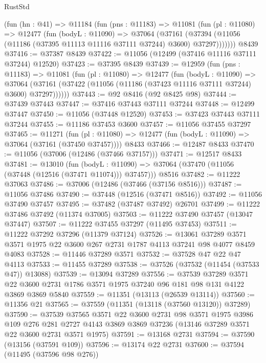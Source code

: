 \begin{lexlean}{RustStd}
\begin{coremodule}
    (fun (hn : @41) =>
    @11184
      (fun (pns : @11183) =>
      @11081
        (fun (pl : @11080) =>
        @12477
          (fun (bodyL : @11090) =>
          @37064
            (@37161
              (@37394 (@11056 (@11186 (@37395 @11113 @11116 @37111 @37244) @3600) @37297)))))))
    @8439
@37416 := @37387 @8439
@37422 := @11056 (@12499 (@37416 @11116 @37111 @37244) @12520)
@37423 := @37395 @8439
@37439 := @12959
    (fun (pns : @11183) =>
    @11081
      (fun (pl : @11080) =>
      @12477
        (fun (bodyL : @11090) =>
        @37064 (@37161 (@37422 (@11056 (@11186 (@37423 @11116 @37111 @37244) @3600) @37297))))))
@37443 := @92 @8416 (@92 @8425 @98)
@37444 := @37439 @37443
@37447 := @37416 @37443 @37111 @37244
@37448 := @12499 @37447
@37450 := @11056 (@37448 @12520)
@37453 := @37423 @37443 @37111 @37244
@37455 := @11186 @37453 @3600
@37457 := @11056 @37455 @37297
@37465 := @11271
    (fun (pl : @11080) => @12477 (fun (bodyL : @11090) => @37064 (@37161 (@37450 @37457))))
    @8433
@37466 := @12487 @8433
@37470 := @11056 (@37006 (@12486 (@37466 @37157)))
@37471 := @12517 @8433
@37481 := @13010
    (fun (bodyL : @11090) => @37064 (@37470 (@11056 (@37448 (@12516 (@37471 @11074))) @37457)))
    @8516
@37482 := @11222 @37063
@37486 := @37006 (@12486 (@37466 (@37156 @8516)))
@37487 := @11056 @37486
@37490 := @37448 (@12516 (@37471 @8516))
@37492 := @11056 @37490 @37457
@37495 := @37482 (@37487 @37492) @26701
@37499 := @11222 @37486 @37492 (@11374 @37005)
@37503 := @11222 @37490 @37457 (@13047 @37447)
@37507 := @11222 @37455 @37297 (@11495 @37453)
@37511 := @11222 @37292 @37296 (@11379 @37124)
@37526 := @13061
    @37289
    @3571
    @3571
    @1975
    @22
    @3600
    @267
    @2731
    @1787
    @4113
    @37241
    @98
    @4077
    @8459
    @4083
@37528 := @11446 @37289 @3571
@37532 := @37528 @47 @22 @47 @4113
@37533 := @11455 @37289
@37538 := @37526 (@37532 (@11454 (@37533 @47)) @13088)
@37539 := @13094 @37289
@37556 := @37539
    @37289
    @3571
    @22
    @3600
    @2731
    @1786
    @3571
    @1975
    @37240
    @96
    @181
    @98
    @131
    @4122
    @3869
    @3869
    @5840
@37559 := @11351 (@13113 (@26539 @13114))
@37560 := @11356 @21
@37565 := @37559 (@11351 (@13118 (@37560 @13120)) @37289)
@37590 := @37539
    @37565
    @3571
    @22
    @3600
    @2731
    @98
    @3571
    @1975
    @3986
    @109
    @276
    @281
    @2727
    @4143
    @3869
    @3869
    @37236
    (@13146 @37289 @3571 @22 @3600 @2731 @3571 @1975)
@37591 := @13168 @2731
@37594 := @37590 (@13156 (@37591 @109))
@37596 := @13174 @22 @2731
@37600 := @37594 (@11495 (@37596 @98 @276))

\end{coremodule}
\end{lexlean}
